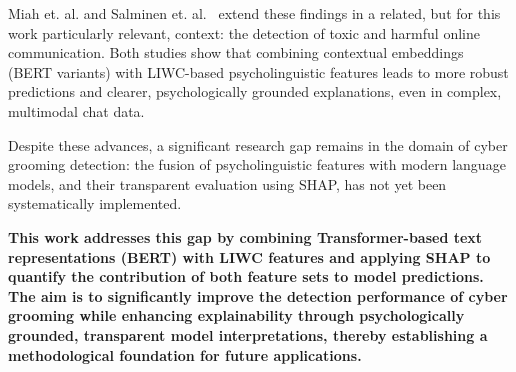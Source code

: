 Miah et. al.\cite{miah-etal-2011-detection} and Salminen et. al.~\cite{salminen2025} extend these findings in a related, but for this work particularly relevant, context: the detection of toxic and harmful online communication. Both studies show that combining contextual embeddings (BERT variants) with LIWC-based psycholinguistic features leads to more robust predictions and clearer, psychologically grounded explanations, even in complex, multimodal chat data.

Despite these advances, a significant research gap remains in the domain of cyber grooming detection: the fusion of psycholinguistic features with modern language models, and their transparent evaluation using SHAP, has not yet been systematically implemented.

\textbf{This work addresses this gap by combining Transformer-based text representations (BERT) with LIWC features and applying SHAP to quantify the contribution of both feature sets to model predictions. The aim is to significantly improve the detection performance of cyber grooming while enhancing explainability through psychologically grounded, transparent model interpretations, thereby establishing a methodological foundation for future applications.}




\begin{comment}
    Explainability in Transformer-based Grooming Detection
    – Wie bisherige Arbeiten XAI nutzen (z. B. Ribeiro et al. 2024, Broome et al., Mersha et al.)
    – Warum psycholinguistische Features (LIWC) besonders geeignet sind: sie sind menschenverständlich, validiert und direkt interpretierbar
    – Kombination von SHAP + LIWC als erklärbare Pipeline


Your Contribution
– Ziel deiner Arbeit: mit LIWC die Erklärbarkeit steigern
– Hinweis, dass du in Kapitel 5/6/7 auf die empirischen Ergebnisse dieser Kombination zurückkommst
\end{comment}








